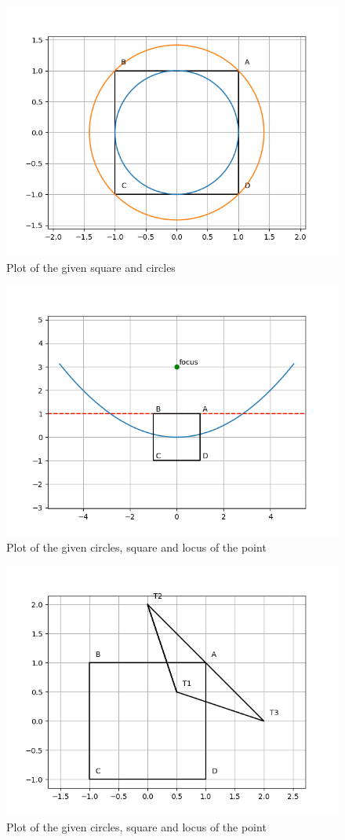 \documentclass[journal]{IEEEtran}
\begin{document}
\begin{figure}[h!]
   \centering
   \includegraphics[width=0.7\linewidth]{figs/plot1.png}
   \caption{Plot of the given square and circles}
   \label{}
\end{figure}

\begin{figure}[h!]
   \centering
   \includegraphics[width=0.7\linewidth]{figs/plot2.png}
   \caption{Plot of the given circles, square and locus of the point }
   \label{}
\end{figure}

\begin{figure}[h!]
   \centering
   \includegraphics[width=0.7\linewidth]{figs/plot3.png}
   \caption{Plot of the given circles, square and locus of the point }
   \label{}
\end{figure}
\end{document}
